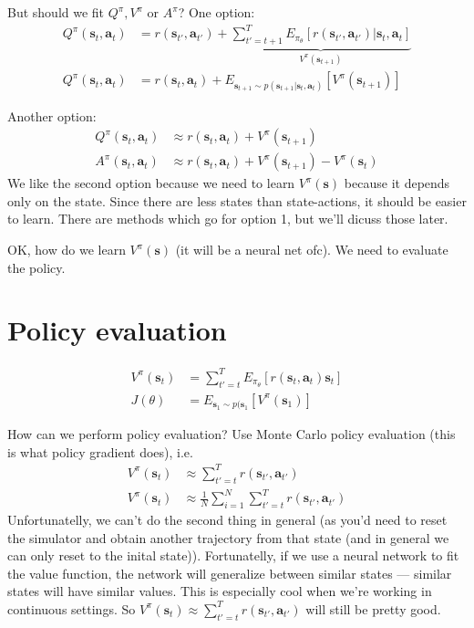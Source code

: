 \documentclass{report}
\begin{document}
But should we fit $Q^\pi, V^\pi$ or $A^\pi$?
One option:
\begin{align}
Q^\pi (\bm{s}_{t}, \bm{a}_{t})  &= r(\bm{s}_{t'}, \bm{a}_{t'}) + \underbrace{\sum_{t'=t+1}^{T} E_{\pi_\theta} \left[ r(\bm{s}_{t'}, \bm{a}_{t'})|\bm{s}_t, \bm{a}_t \right]}_{V^\pi(\bm{s}_{t+1})} \\
Q^\pi (\bm{s}_{t}, \bm{a}_{t})  &= r(\bm{s}_{t}, \bm{a}_{t}) + E_{\bm{s}_{t+1} \sim p(\bm{s}_{t+1}|\bm{s}_t, \bm{a}_t)} \left[ V^\pi (\bm{s}_{t+1}) \right] 
\end{align}

Another option:
\begin{align}
		Q^{\pi} (\bm{s}_{t}, \bm{a}_{t})  &\approx r(\bm{s}_{t}, \bm{a}_{t}) + V^\pi (\bm{s}_{t+1}) \\
		A^\pi (\bm{s}_{t}, \bm{a}_{t})  &\approx r(\bm{s}_{t}, \bm{a}_{t}) + V^\pi (\bm{s}_{t+1})  - V^\pi(\bm{s}_t)
\end{align}
We like the second option because we need to learn $V^\pi(\bm{s})$ because it depends only on the state.
Since there are less states than state-actions, it should be easier to learn.
There are methods which go for option 1, but we'll dicuss those later.

OK, how do we learn $V^\pi(\bm{s})$ (it will be a neural net ofc).
We need to evaluate the policy.

\section{Policy evaluation}
\begin{align}
		V^\pi(\bm{s}_t) &= \sum_{t'=t}^{T} E_{\pi_\theta} \left[ r(\bm{s}_{t}, \bm{a}_{t})\bm{s}_t \right] \\
		J(\theta) &= E_{\bm{s}_1 \sim p(\bm{s}_1} \left[ V^\pi (\bm{s}_1) \right] 
\end{align}

How can we perform policy evaluation? 
Use Monte Carlo policy evaluation (this is what policy gradient does), i.e.
\begin{align}
		V^\pi (\bm{s}_t) &\approx \sum_{t'=t}^{T} r(\bm{s}_{t'}, \bm{a}_{t'})\\
V^\pi (\bm{s}_t) &\approx \frac{1}{N} \sum_{i=1}^{N} \sum_{t'=t}^{T} r(\bm{s}_{t'}, \bm{a}_{t'})
\end{align}
Unfortunatelly, we can't do the second thing in general (as you'd need to reset the simulator and obtain 
another trajectory from that state (and in general we can only reset to the inital state)).
Fortunatelly, if we use a neural network to fit the value function, the network will generalize between similar states ---
similar states will have similar values. This is especially cool when we're working in continuous settings.
So $V^\pi (\bm{s}_t) \approx \sum_{t'=t}^{T} r(\bm{s}_{t'}, \bm{a}_{t'})$ will still be pretty good.
\end{document}
